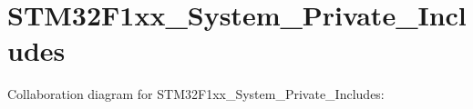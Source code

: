 \hypertarget{group__STM32F1xx__System__Private__Includes}{}\section{S\+T\+M32\+F1xx\+\_\+\+System\+\_\+\+Private\+\_\+\+Includes}
\label{group__STM32F1xx__System__Private__Includes}
Collaboration diagram for S\+T\+M32\+F1xx\+\_\+\+System\+\_\+\+Private\+\_\+\+Includes\+:
